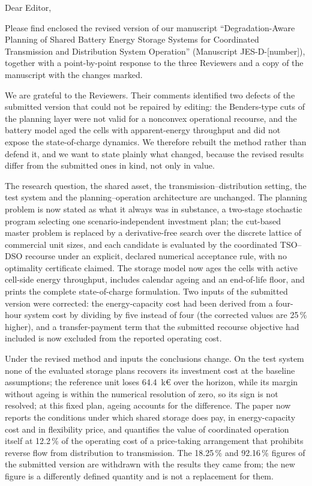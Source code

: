\documentclass[12pt]{letter}
\begin{document}
\begin{letter}{}

    \opening{Dear Editor,}

    Please find enclosed the revised version of our manuscript ``Degradation-Aware Planning of Shared Battery Energy Storage Systems for Coordinated Transmission and Distribution System Operation'' (Manuscript JES-D-[number]), together with a point-by-point response to the three Reviewers and a copy of the manuscript with the changes marked.

    We are grateful to the Reviewers. Their comments identified two defects of the submitted version that could not be repaired by editing: the Benders-type cuts of the planning layer were not valid for a nonconvex operational recourse, and the battery model aged the cells with apparent-energy throughput and did not expose the state-of-charge dynamics. We therefore rebuilt the method rather than defend it, and we want to state plainly what changed, because the revised results differ from the submitted ones in kind, not only in value.

    The research question, the shared asset, the transmission--distribution setting, the test system and the planning--operation architecture are unchanged. The planning problem is now stated as what it always was in substance, a two-stage stochastic program selecting one scenario-independent investment plan; the cut-based master problem is replaced by a derivative-free search over the discrete lattice of commercial unit sizes, and each candidate is evaluated by the coordinated TSO--DSO recourse under an explicit, declared numerical acceptance rule, with no optimality certificate claimed. The storage model now ages the cells with active cell-side energy throughput, includes calendar ageing and an end-of-life floor, and prints the complete state-of-charge formulation. Two inputs of the submitted version were corrected: the energy-capacity cost had been derived from a four-hour system cost by dividing by five instead of four (the corrected values are 25\,\% higher), and a transfer-payment term that the submitted recourse objective had included is now excluded from the reported operating cost.

    Under the revised method and inputs the conclusions change. On the test system none of the evaluated storage plans recovers its investment cost at the baseline assumptions; the reference unit loses 64.4~k\euro{} over the horizon, while its margin without ageing is within the numerical resolution of zero, so its sign is not resolved; at this fixed plan, ageing accounts for the difference. The paper now reports the conditions under which shared storage does pay, in energy-capacity cost and in flexibility price, and quantifies the value of coordinated operation itself at 12.2\,\% of the operating cost of a price-taking arrangement that prohibits reverse flow from distribution to transmission. The 18.25\,\% and 92.16\,\% figures of the submitted version are withdrawn with the results they came from; the new figure is a differently defined quantity and is not a replacement for them.


\end{letter}
\end{document}
